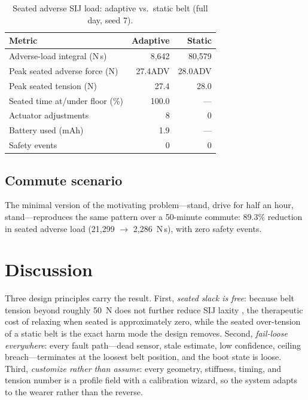 \documentclass[11pt]{article}
\begin{document}
\begin{table}[t]
\centering
\caption{Seated adverse SIJ load: adaptive vs.\ static belt (full day,
seed 7).}
\label{tab:results}
\begin{tabular}{lrr}
\toprule
Metric & Adaptive & Static \\
\midrule
Adverse-load integral (N\,s) & 8,642 & 80,579 \\
Peak seated adverse force (N) & 27.4ADV & 28.0ADV \\
Peak seated tension (N) & 27.4 & 28.0 \\
Seated time at/under floor (\%) & 100.0 & --- \\
Actuator adjustments & 8 & 0 \\
Battery used (mAh) & 1.9 & --- \\
Safety events & 0 & 0 \\
\bottomrule
\end{tabular}
\end{table}

\subsection{Commute scenario}
The minimal version of the motivating problem---stand, drive for half
an hour, stand---reproduces the same pattern over a
50-minute commute: 89.3\% reduction in seated
adverse load (21,299 $\rightarrow$ 2,286~N\,s), with
zero safety events.

\section{Discussion}
Three design principles carry the result. First, \emph{seated slack is
free}: because belt tension beyond roughly 50~N does not further
reduce SIJ laxity \cite{ref4}, the therapeutic cost of relaxing when
seated is approximately zero, while the seated over-tension of a static
belt is the exact harm mode the design removes. Second,
\emph{fail-loose everywhere}: every fault path---dead sensor, stale
estimate, low confidence, ceiling breach---terminates at the loosest
belt position, and the boot state is loose. Third,
\emph{customize rather than assume}: every geometry, stiffness, timing,
and tension number is a profile field with a calibration wizard, so the
system adapts to the wearer rather than the reverse.
\end{document}
